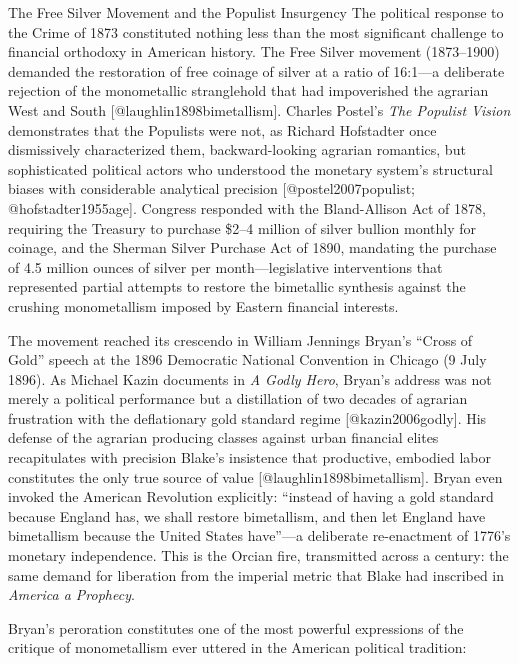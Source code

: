 \documentclass[
  ignorenonframetext,
]{beamer}
\begin{document}
\begin{frame}{The Free Silver Movement and the Populist Insurgency}
\protect{}\label{the-free-silver-movement-and-the-populist-insurgency}
The political response to the Crime of 1873 constituted nothing less
than the most significant challenge to financial orthodoxy in American
history. The Free Silver movement (1873--1900) demanded the restoration
of free coinage of silver at a ratio of 16:1---a deliberate rejection of
the monometallic stranglehold that had impoverished the agrarian West
and South {[}@laughlin1898bimetallism{]}. Charles Postel's \emph{The
Populist Vision} demonstrates that the Populists were not, as Richard
Hofstadter once dismissively characterized them, backward-looking
agrarian romantics, but sophisticated political actors who understood
the monetary system's structural biases with considerable analytical
precision {[}@postel2007populist; @hofstadter1955age{]}. Congress
responded with the Bland-Allison Act of 1878, requiring the Treasury to
purchase \$2--4 million of silver bullion monthly for coinage, and the
Sherman Silver Purchase Act of 1890, mandating the purchase of 4.5
million ounces of silver per month---legislative interventions that
represented partial attempts to restore the bimetallic synthesis against
the crushing monometallism imposed by Eastern financial interests.

The movement reached its crescendo in William Jennings Bryan's ``Cross
of Gold'' speech at the 1896 Democratic National Convention in Chicago
(9 July 1896). As Michael Kazin documents in \emph{A Godly Hero},
Bryan's address was not merely a political performance but a
distillation of two decades of agrarian frustration with the
deflationary gold standard regime {[}@kazin2006godly{]}. His defense of
the agrarian producing classes against urban financial elites
recapitulates with precision Blake's insistence that productive,
embodied labor constitutes the only true source of value
{[}@laughlin1898bimetallism{]}. Bryan even invoked the American
Revolution explicitly: ``instead of having a gold standard because
England has, we shall restore bimetallism, and then let England have
bimetallism because the United States have''---a deliberate re-enactment
of 1776's monetary independence. This is the Orcian fire, transmitted
across a century: the same demand for liberation from the imperial
metric that Blake had inscribed in \emph{America a Prophecy}.

Bryan's peroration constitutes one of the most powerful expressions of
the critique of monometallism ever uttered in the American political
tradition:


\end{frame}
\end{document}
